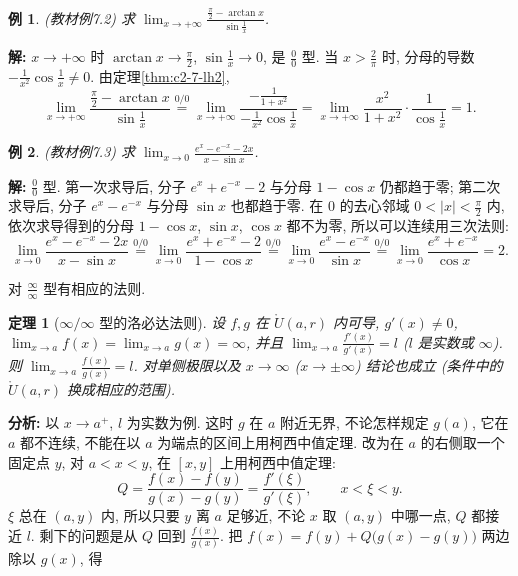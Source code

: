 \documentclass[UTF8,openany]{ctexbook}
\theoremstyle{chinesetextbook}
\newtheorem{example}{例}[section]
\newtheorem{theorem}{定理}[section]
\newenvironment{cnsolution}{\par\indent\textbf{解:} \ignorespaces}{\par}
\begin{document}
\begin{example}\label{ex:c2-7-2}
\textnormal{(教材例7.2)} 求 $\displaystyle\lim_{x\to+\infty}\frac{\frac\pi2-\arctan x}{\sin\frac1x}$.
\end{example}
\begin{cnsolution}
$x\to+\infty$ 时 $\displaystyle\arctan x\to\frac\pi2$, $\displaystyle\sin\frac1x\to0$, 是 $\displaystyle\frac00$ 型. 当 $\displaystyle x>\frac2\pi$ 时, 分母的导数 $\displaystyle-\frac1{x^2}\cos\frac1x\ne0$. 由定理\ref{thm:c2-7-lh2},
\[
\lim_{x\to+\infty}\frac{\frac\pi2-\arctan x}{\sin\frac1x}\overset{0/0}{=}\lim_{x\to+\infty}\frac{-\frac1{1+x^2}}{-\frac1{x^2}\cos\frac1x}=\lim_{x\to+\infty}\frac{x^2}{1+x^2}\cdot\frac1{\cos\frac1x}=1.
\]
\end{cnsolution}
\begin{example}\label{ex:c2-7-3}
\textnormal{(教材例7.3)} 求 $\displaystyle\lim_{x\to0}\frac{e^x-e^{-x}-2x}{x-\sin x}$.
\end{example}
\begin{cnsolution}
$\displaystyle\frac00$ 型. 第一次求导后, 分子 $e^x+e^{-x}-2$ 与分母 $1-\cos x$ 仍都趋于零; 第二次求导后, 分子 $e^x-e^{-x}$ 与分母 $\sin x$ 也都趋于零. 在 $0$ 的去心邻域 $\displaystyle0<|x|<\frac\pi2$ 内, 依次求导得到的分母 $1-\cos x$, $\sin x$, $\cos x$ 都不为零, 所以可以连续用三次法则:
\[
\lim_{x\to0}\frac{e^x-e^{-x}-2x}{x-\sin x}\overset{0/0}{=}\lim_{x\to0}\frac{e^x+e^{-x}-2}{1-\cos x}\overset{0/0}{=}\lim_{x\to0}\frac{e^x-e^{-x}}{\sin x}\overset{0/0}{=}\lim_{x\to0}\frac{e^x+e^{-x}}{\cos x}=2.
\]
\end{cnsolution}
对 $\displaystyle\frac\infty\infty$ 型有相应的法则.
\begin{theorem}[$\infty/\infty$ 型的洛必达法则]\label{thm:c2-7-lh3}
设 $f,g$ 在 $\mathring U(a,r)$ 内可导, $g'(x)\ne0$, $\displaystyle\lim_{x\to a}f(x)=\lim_{x\to a}g(x)=\infty$, 并且 $\displaystyle\lim_{x\to a}\frac{f'(x)}{g'(x)}=l$ ($l$ 是实数或 $\infty$). 则 $\displaystyle\lim_{x\to a}\frac{f(x)}{g(x)}=l$. 对单侧极限以及 $x\to\infty$ ($x\to\pm\infty$) 结论也成立 (条件中的 $\mathring U(a,r)$ 换成相应的范围).
\end{theorem}
\par\indent\textbf{分析:} 以 $x\to a^+$, $l$ 为实数为例. 这时 $g$ 在 $a$ 附近无界, 不论怎样规定 $g(a)$, 它在 $a$ 都不连续, 不能在以 $a$ 为端点的区间上用柯西中值定理. 改为在 $a$ 的右侧取一个固定点 $y$, 对 $a<x<y$, 在 $[x,y]$ 上用柯西中值定理:
\[
Q=\frac{f(x)-f(y)}{g(x)-g(y)}=\frac{f'(\xi)}{g'(\xi)},\qquad x<\xi<y.
\]
$\xi$ 总在 $(a,y)$ 内, 所以只要 $y$ 离 $a$ 足够近, 不论 $x$ 取 $(a,y)$ 中哪一点, $Q$ 都接近 $l$. 剩下的问题是从 $Q$ 回到 $\displaystyle\frac{f(x)}{g(x)}$. 把 $f(x)=f(y)+Q\bigl(g(x)-g(y)\bigr)$ 两边除以 $g(x)$, 得
\end{document}
